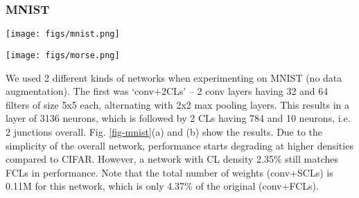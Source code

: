 \documentclass[conference]{IEEEtran}
\begin{document}

\subsubsection{MNIST}\label{anares-mnist}

\begin{figure*}[!t]
\begin{center}
\texttt{[image: figs/mnist.png]}
\end{center}
\caption{(a)--(b) Performance results of pre-defined sparsity on an MNIST conv network with different densities, each trained for 30 epochs. (c) Performance vs. connection density for different MNIST CL only networks, each trained for 100 epochs.}
\label{fig-mnist}
\end{figure*}

\begin{figure*}[!t]
\begin{center}
\texttt{[image: figs/morse.png]}
\end{center}
\caption{(a) Performance vs. connection density for a Morse CL only 2 junction network. (b) and (c) Performance results by varying individual junction densities while overall density is fixed at (b) 25\% (c) 50\%. All cases trained for 30 epochs.}
\label{fig-morse}
\end{figure*}

We used 2 different kinds of networks when experimenting on MNIST (no data augmentation). The first was `conv+2CLs' %
-- 2 conv layers having 32 and 64 filters of size 5x5 each, alternating with 2x2 max pooling layers. This results in a layer of 3136 neurons, which is followed by 2 CLs having 784 and 10 neurons, i.e. 2 junctions overall. Fig. \ref{fig-mnist}(a) and (b) show the results. Due to the simplicity of the overall network, performance starts degrading at higher densities compared to CIFAR. However, a network with CL density 2.35\% still matches FCLs in performance. Note that the total number of weights (conv+SCLs) is 0.11M for this network, which is only 4.37\% of the original (conv+FCLs). 
\end{document}

